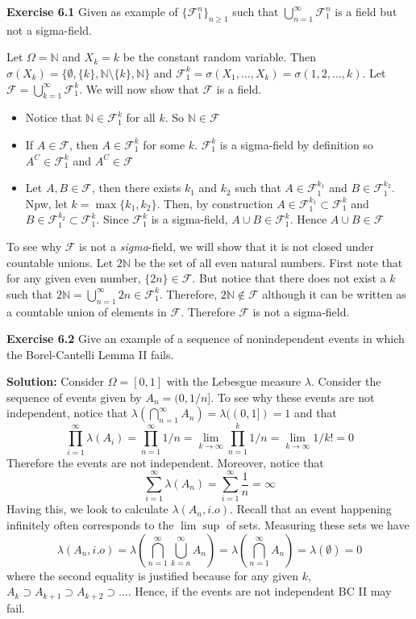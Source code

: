 \documentclass[12pt]{article}  %
\newcommand{\N}{{\mathbb{N}}}
\begin{document}
\textbf{Exercise 6.1} Given as example of $\{\mathcal{F}_1^n\}_{n\geq 1}$ such that $\bigcup_{n=1}^{\infty}\mathcal{F}_{1}^{n}$ is a field but not a sigma-field. 

 Let $\Omega = \N$ and $X_k = k$ be the constant random variable. Then $\sigma(X_k) = \{\emptyset, \{k\}, \N\setminus\{k\},\N\}$ and $\mathcal{F}_1^k = \sigma(X_1, \ldots, X_k) = \sigma(1,2,\ldots, k)$. Let $\mathcal{F} = \bigcup_{k =1}^{\infty}\mathcal{F}_{1}^{k}$. We will now show that $\mathcal{F}$ is a field.

\begin{itemize}
\item Notice that $\N\in\mathcal{F}_1^{k}$ for all $k$. So $\N\in\mathcal{F}$

\item If $A\in\mathcal{F}$, then $A\in \mathcal{F}_1^k$ for some $k$. $\mathcal{F}_1^k$ is a sigma-field by definition so $A^{C}\in\mathcal{F}_1^k$ and $A^{C}\in\mathcal{F}$
\item Let $A,B\in \mathcal{F}$, then there exists $k_1$ and $k_2$ such that $A\in\mathcal{F}_1^{k_1}$ and $B\in\mathcal{F}_1^{k_2}$. Npw, let $k = \max\{k_1, k_2\}$. Then, by construction $A\in \mathcal{F}_1^{k_1}\subset \mathcal{F}_1^{k}$ and $B\in \mathcal{F}_1^{k_2}\subset \mathcal{F}_1^{k}$. Since $\mathcal{F}_1^{k}$ is a sigma-field, $A\cup B\in \mathcal{F}_1^{k}$. Hence $A\cup B \in \mathcal{F}$
\end{itemize}

To see why $\mathcal{F}$ is not a \textit{sigma}-field, we will show that it is not closed under countable unions. Let $2\N$ be the set of all even natural numbers. First note that for any given even number, $\{2n\}\in\mathcal{F}$. But notice that there does not exist a $k$ such that $2\N = \bigcup_{n=1}^{\infty}2n\in\mathcal{F}_1^k$. Therefore, $2\N\not\in\mathcal{F}$ although it can be written as a countable union of elements in $\mathcal{F}$. Therefore $\mathcal{F}$ is not a sigma-field. 

\newpage

\textbf{Exercise 6.2} Give an example of a sequence of nonindependent events in which the Borel-Cantelli Lemma II fails. 

\textbf{Solution:} Consider $\Omega = [0,1]$ with the Lebesgue measure  $\lambda$. Consider the sequence of events given by $A_n = (0,1/n]$. To see why these events are not independent, notice that $\lambda(\bigcap_{n=1}^{\infty}A_n) = \lambda((0,1]) = 1$ and that $$\prod_{i=1}^{\infty} \lambda(A_i)= \prod_{n=1}^{\infty}1/n = \lim_{k\to\infty}\prod_{n=1}^k1/n = \lim_{k\to\infty}1/k! = 0$$ Therefore the events are not independent. Moreover, notice that $$\sum_{i=1}^{\infty}\lambda(A_n) = \sum_{i=1}^{\infty}\frac{1}{n} = \infty$$ Having this, we look to calculate $\lambda(A_n, i.o)$. Recall that an event happening infinitely often corresponds to the $\lim\sup$ of sets. Measuring these sets we have $$\lambda(A_n, i.o) = \lambda(\bigcap_{n=1}^{\infty}\bigcup_{k=n}^{\infty}A_n) = \lambda(\bigcap_{n=1}^{\infty}A_n) = \lambda(\emptyset) = 0$$ where the second equality is justified because for any given $k$, $A_k\supset A_{k+1}\supset A_{k+2}\supset\dots$. Hence, if the events are not independent BC II may fail. 
\end{document}
